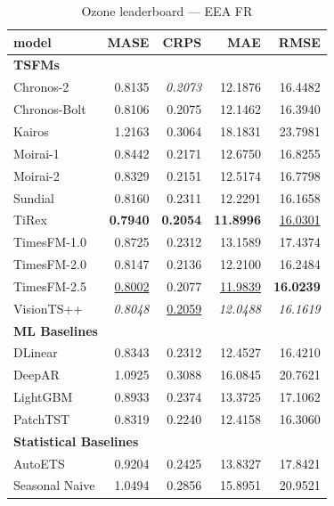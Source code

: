 \begin{table}[H]
\caption{Ozone leaderboard --- EEA FR}
\centering
\begin{small}
\begin{tabular}{lrrrr}
\toprule
model & MASE & CRPS & MAE & RMSE \\
\midrule
\multicolumn{5}{l}{\textbf{TSFMs}} \\
Chronos-2 & 0.8135 & \textit{0.2073} & 12.1876 & 16.4482 \\
Chronos-Bolt & 0.8106 & 0.2075 & 12.1462 & 16.3940 \\
Kairos & 1.2163 & 0.3064 & 18.1831 & 23.7981 \\
Moirai-1 & 0.8442 & 0.2171 & 12.6750 & 16.8255 \\
Moirai-2 & 0.8329 & 0.2151 & 12.5174 & 16.7798 \\
Sundial & 0.8160 & 0.2311 & 12.2291 & 16.1658 \\
TiRex & \textbf{0.7940} & \textbf{0.2054} & \textbf{11.8996} & \underline{16.0301} \\
TimesFM-1.0 & 0.8725 & 0.2312 & 13.1589 & 17.4374 \\
TimesFM-2.0 & 0.8147 & 0.2136 & 12.2100 & 16.2484 \\
TimesFM-2.5 & \underline{0.8002} & 0.2077 & \underline{11.9839} & \textbf{16.0239} \\
VisionTS++ & \textit{0.8048} & \underline{0.2059} & \textit{12.0488} & \textit{16.1619} \\
\midrule
\multicolumn{5}{l}{\textbf{ML Baselines}} \\
DLinear & 0.8343 & 0.2312 & 12.4527 & 16.4210 \\
DeepAR & 1.0925 & 0.3088 & 16.0845 & 20.7621 \\
LightGBM & 0.8933 & 0.2374 & 13.3725 & 17.1062 \\
PatchTST & 0.8319 & 0.2240 & 12.4158 & 16.3060 \\
\midrule
\multicolumn{5}{l}{\textbf{Statistical Baselines}} \\
AutoETS & 0.9204 & 0.2425 & 13.8327 & 17.8421 \\
Seasonal Naive & 1.0494 & 0.2856 & 15.8951 & 20.9521 \\
\bottomrule
\end{tabular}
\end{small}
\end{table}
